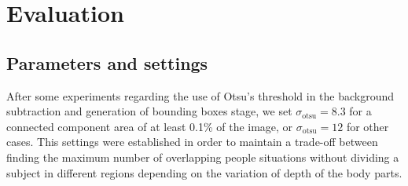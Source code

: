 \documentclass[10pt,twocolumn,letterpaper]{article}
\begin{document}
%
%
%


\section{Evaluation}
\label{sec:evaluation}

\subsection{Parameters and settings}
\label{ssec:parametersandsettings}

After some experiments regarding the use of Otsu's threshold in the background subtraction and generation of bounding boxes stage, we set $\sigma_\text{otsu} = 8.3$ for a connected component area of at least 0.1\% of the image, or  $\sigma_\text{otsu} = 12$ for other cases. This settings were established in order to maintain a trade-off between finding the maximum number of overlapping people situations without dividing a subject in different regions depending on the variation of depth of the body parts.
\end{document}
